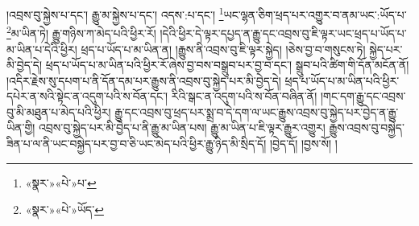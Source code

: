 །འབྲས་བུ་སྐྱེས་པ་དང་། རྒྱུ་མ་སྐྱེས་པ་དང་། འདས་:པ་དང་། \footnote{«སྣར་»«པེ་»པ་}ཡང་ལྷན་ཅིག་ཕྲད་པར་འགྱུར་བ་ནམ་ཡང་:ཡོད་པ་\footnote{«སྣར་»«པེ་»ཡོད་}མ་ཡིན་ཏེ། རྒྱུ་གཉིས་ཀ་མེད་པའི་ཕྱིར་རོ། །དེའི་ཕྱིར་དེ་ལྟར་དཔྱད་ན་རྒྱུ་དང་འབྲས་བུ་ཇི་ལྟར་ཡང་ཕྲད་པ་ཡོད་པ་མ་ཡིན་པ་དེའི་ཕྱིར། ཕྲད་པ་ཡོད་པ་མ་ཡིན་ན། །རྒྱུས་ནི་འབྲས་བུ་ཇི་ལྟར་སྐྱེད། །ཅེས་བྱ་བ་གསུངས་ཏེ། སྐྱེད་པར་མི་བྱེད་དེ། ཕྲད་པ་ཡོད་པ་མ་ཡིན་པའི་ཕྱིར་རོ་ཞེས་བྱ་བས་བསྒྲུབ་པར་བྱ་བ་དང་། སྒྲུབ་པའི་ཚིག་གི་དོན་མངོན་ནོ། །འདིར་རྗེས་སུ་དཔག་པ་ནི་དོན་དམ་པར་རྒྱུས་ནི་འབྲས་བུ་སྐྱེད་པར་མི་བྱེད་དེ། ཕྲད་པ་ཡོད་པ་མ་ཡིན་པའི་ཕྱིར་དཔེར་ན་སའི་སྟེང་ན་འདུག་པའི་ས་བོན་དང་། རིའི་སྒང་ན་འདུག་པའི་ས་བོན་བཞིན་ནོ། །གང་དག་རྒྱུ་དང་འབྲས་བུ་མི་མཐུན་པ་མེད་པའི་ཕྱིར། རྒྱུ་དང་འབྲས་བུ་ཕྲད་པར་སྨྲ་བ་དེ་དག་ལ་ཡང་རྒྱུས་འབྲས་བུ་སྐྱེད་པར་བྱེད་ན་རྒྱུ་ཡིན་གྱི། འབྲས་བུ་སྐྱེད་པར་མི་བྱེད་པ་ནི་རྒྱུ་མ་ཡིན་པས། རྒྱུ་མ་ཡིན་པ་ཇི་ལྟར་རྒྱུར་འགྱུར། རྒྱུས་འབྲས་བུ་བསྐྱེད་ཟིན་པ་ལ་ནི་ཡང་བསྐྱེད་པར་བྱ་བ་ཅི་ཡང་མེད་པའི་ཕྱིར་རྒྱུ་ཉིད་མི་སྲིད་དོ། །བྱེད་དོ། །བྱས་སོ། །
